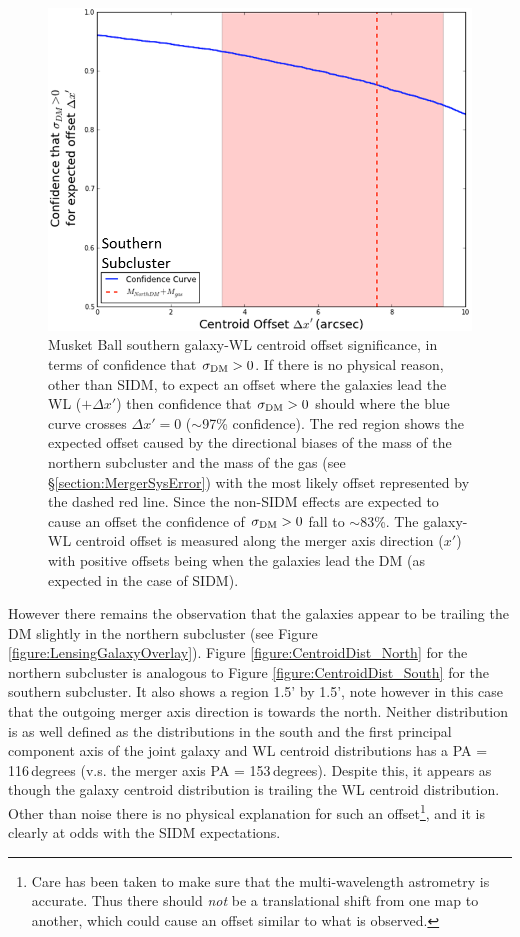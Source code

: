 \begin{figure}
\centering
\includegraphics[width=5in]{Chapter4/AnalysisFiles/GalDenVsHSTWL_pzpen_delxPC_south_reformat.png}
\caption[Musket Ball southern subcluster galaxy and weak lensing centroid offset significance.]{
Musket Ball southern galaxy-WL centroid offset significance, in terms of confidence that $\sigma_{\rm DM}>0$.
If there is no physical reason, other than SIDM, to expect an offset where the galaxies lead the WL ($+\Delta x'$) then confidence that $\sigma_{\rm DM}>0$ should where the blue curve crosses $\Delta x'=0$ ($\sim$97\% confidence).
The red region shows the expected offset caused by the directional biases of the mass of the northern subcluster and the mass of the gas (see \S\ref{section:MergerSysError}) with the most likely offset represented by the dashed red line.
Since the non-SIDM effects are expected to cause an offset the confidence of $\sigma_{\rm DM}>0$ fall to $\sim$83\%.
The galaxy-WL centroid offset is measured along the merger axis direction ($x'$) with positive offsets being when the galaxies lead the DM (as expected in the case of SIDM).
}
\label{figure:CentroidSignificance_South}
\end{figure}

However there remains the observation that the galaxies appear to be trailing the DM slightly in the northern subcluster (see Figure \ref{figure:LensingGalaxyOverlay}).
Figure \ref{figure:CentroidDist_North} for the northern subcluster is analogous to Figure \ref{figure:CentroidDist_South} for the southern subcluster.
It also shows a region 1.5' by 1.5', note however in this case that the outgoing merger axis direction is towards the north.
Neither distribution is as well defined as the distributions in the south and the first principal component axis of the joint galaxy and WL centroid distributions has a PA = 116\,degrees (v.s. the merger axis PA = 153\,degrees).
Despite this, it appears as though the galaxy centroid distribution is trailing the WL centroid distribution.
Other than noise there is no physical explanation for such an offset\footnote{Care has been taken to make sure that the multi-wavelength astrometry is accurate. Thus there should \textit{not} be a translational shift from one map to another, which could cause an offset similar to what is observed.}, and it is clearly at odds with the SIDM expectations.

